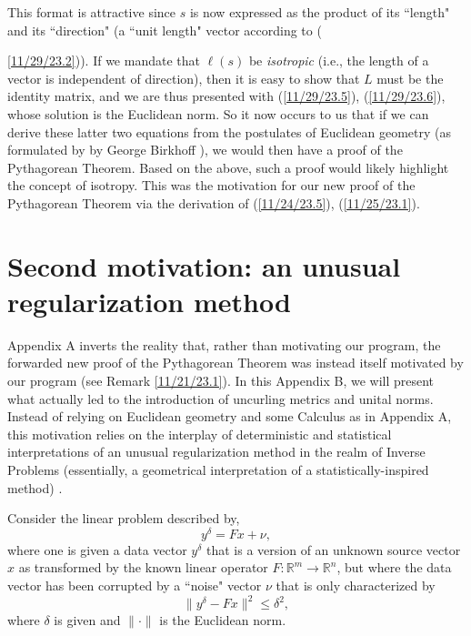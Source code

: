 \documentclass{amsart}
\numberwithin{equation}{section}
\theoremstyle{definition}
\numberwithin{theorem}{section}
\begin{document}
This format is attractive since $s$ is now expressed as the product of its ``length" and its ``direction" (a ``unit length" vector according to ({\ref{11/29/23.2})).  If we mandate that $\ell(s)$ be {\it isotropic} (i.e., the length of a vector is independent of direction), then it is easy to show that $L$ must be the identity matrix, and we are thus presented with (\ref{11/29/23.5}), (\ref{11/29/23.6}), whose solution is the Euclidean norm. So it now occurs to us that if we can derive these latter two equations from the postulates of Euclidean geometry (as formulated by by George Birkhoff \cite{birkhoff:1932}), we would then have a proof of the Pythagorean Theorem.  Based on the above, such a proof would likely highlight the concept of isotropy. This was the motivation for our new proof of the Pythagorean Theorem via the derivation of (\ref{11/24/23.5}), (\ref{11/25/23.1}).
  
  \bigskip\bigskip
  
  \section{Second motivation: an unusual regularization method}
     Appendix A inverts the reality that, rather than motivating our program, the forwarded new proof of the Pythagorean Theorem was instead itself motivated by our program (see Remark \ref{11/21/23.1}). In this Appendix B, we will present what actually led to the introduction of uncurling metrics and unital norms.  Instead of relying on Euclidean geometry and some Calculus as in Appendix A, this motivation relies on the interplay of deterministic and statistical interpretations of an unusual regularization method in the realm of Inverse Problems (essentially, a geometrical interpretation of a statistically-inspired method) \cite{fgreensite:2022d}.
  
    
 Consider the linear problem described by, \begin{equation}\label{7/7/20.9}  y^\delta=Fx + \nu,\end{equation} where one is given a data vector $y^\delta$ that is a version of an unknown source vector $x$ as transformed by the known linear operator $F:\mathbb{R}^m\rightarrow\mathbb{R}^n$, but where the data vector has been corrupted by a ``noise" vector $\nu$ that is only characterized by   \begin{equation}\label{7/12/20.1} \| y^\delta - Fx\|^2 \le \delta^2, \end{equation}  where $\delta$ is given and $\|\cdot \|$ is the Euclidean norm.  
    
}
\end{document}
